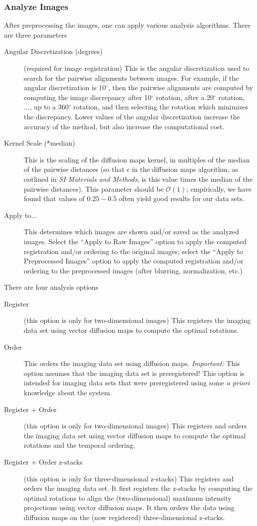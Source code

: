 \documentclass[12pt]{article}
\newcommand{\SI}[0]{\textit{SI Materials and Methods}}
\begin{document}
\subsubsection{Analyze Images}

After preprocessing the images, one can apply various analysis algorithms. 
%
There are three parameters
%
\begin{description}
%
\item[Angular Discretization (degrees)] (required for image registration) This is the angular discretization used to search for the pairwise alignments between images. For example, if the angular discretization is 10$^\circ$, then the pairwise alignments are computed by computing the image discrepancy after 10$^\circ$ rotation, after a 20$^\circ$ rotation, ..., up to a 360$^\circ$ rotation, and then selecting the rotation which minimizes the discrepancy. Lower values of the angular discretization increase the accuracy of the method, but also increase the computational cost. 
%
\item[Kernel Scale (*median)] This is the scaling of the diffusion maps kernel, in multiples of the median of the pairwise distances (so that $\epsilon$ in the diffusion maps algorithm, as outlined in \SI, is this value times the median of the pairwise distances). This parameter should be $\mathcal{O}(1)$; empirically, we have found that values of $0.25-0.5$ often yield good results for our data sets. 
%
\item[Apply to...]  This determines which images are shown and/or saved as the analyzed images. Select the ``Apply to Raw Images'' option to apply the computed registration and/or ordering to the original images; select the ``Apply to Preprocessed Images'' option to apply the computed registration and/or ordering to the preprocessed images (after blurring, normalization, etc.)
%
\end{description}

There are four analysis options
\begin{description}
%
\item[Register] (this option is only for two-dimensional images) This registers the imaging data set using vector diffusion maps to compute the optimal rotations. 
%
\item[Order] This orders the imaging data set using diffusion maps. {\em Important:} This option assumes that the imaging data set is preregistered! This option is intended for imaging data sets that were preregistered using some {\em a priori} knowledge about the system. 
%
\item[Register + Order] (this option is only for two-dimensional images) This registers and orders the imaging data set using vector diffusion maps to compute the optimal rotations and the temporal ordering. 
%
\item[Register + Order z-stacks] (this option is only for three-dimensional z-stacks) This registers and orders the imaging data set. It first registers the z-stacks by computing the optimal rotations to align the (two-dimensional) maximum intensity projections using vector diffusion maps.  It then orders the data using diffusion maps on the (now registered) three-dimensional z-stacks. 
%
\end{description}
\end{document}
